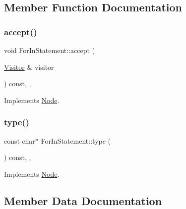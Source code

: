 \subsection{Member Function Documentation}
\mbox{\label{struct_for_in_statement_ab5ee623aba6eebd12e52a9196e33e64b}} 
\subsubsection{\texorpdfstring{accept()}{accept()}}
{\footnotesize\ttfamily void For\+In\+Statement\+::accept (\begin{DoxyParamCaption}\item[{\hyperlink{struct_visitor}{Visitor} \&}]{visitor }\end{DoxyParamCaption}) const\hspace{0.3cm}{\ttfamily [inline]}, {\ttfamily [override]}, {\ttfamily [virtual]}}



Implements \hyperlink{struct_node_a10bd7af968140bbf5fa461298a969c71}{Node}.

\mbox{\label{struct_for_in_statement_a5dd65175f49087b46e5e2f6d34246a1f}} 
\subsubsection{\texorpdfstring{type()}{type()}}
{\footnotesize\ttfamily const char$\ast$ For\+In\+Statement\+::type (\begin{DoxyParamCaption}{ }\end{DoxyParamCaption}) const\hspace{0.3cm}{\ttfamily [inline]}, {\ttfamily [override]}, {\ttfamily [virtual]}}



Implements \hyperlink{struct_node_a82f29420d0a38efcc370352528e94e9b}{Node}.



\subsection{Member Data Documentation}
\mbox{\label{struct_for_in_statement_a865933063222b4eb53866423c444c1ca}} 
